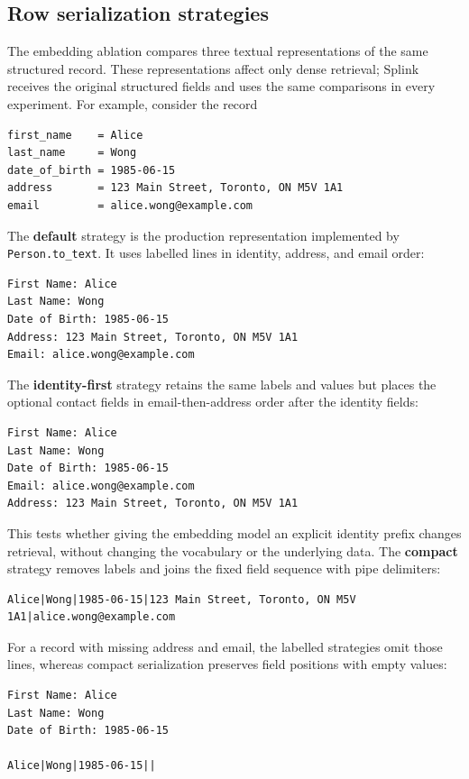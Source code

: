 \documentclass[conference]{IEEEtran}
\begin{document}
\subsection{Row serialization strategies}
The embedding ablation compares three textual representations of the same structured record. These representations affect only dense retrieval; Splink receives the original structured fields and uses the same comparisons in every experiment. For example, consider the record

\begin{lstlisting}
first_name    = Alice
last_name     = Wong
date_of_birth = 1985-06-15
address       = 123 Main Street, Toronto, ON M5V 1A1
email         = alice.wong@example.com
\end{lstlisting}

The \textbf{default} strategy is the production representation implemented by \texttt{Person.to\_text}. It uses labelled lines in identity, address, and email order:

\begin{lstlisting}
First Name: Alice
Last Name: Wong
Date of Birth: 1985-06-15
Address: 123 Main Street, Toronto, ON M5V 1A1
Email: alice.wong@example.com
\end{lstlisting}

The \textbf{identity-first} strategy retains the same labels and values but places the optional contact fields in email-then-address order after the identity fields:

\begin{lstlisting}
First Name: Alice
Last Name: Wong
Date of Birth: 1985-06-15
Email: alice.wong@example.com
Address: 123 Main Street, Toronto, ON M5V 1A1
\end{lstlisting}

This tests whether giving the embedding model an explicit identity prefix changes retrieval, without changing the vocabulary or the underlying data. The \textbf{compact} strategy removes labels and joins the fixed field sequence with pipe delimiters:

\begin{lstlisting}
Alice|Wong|1985-06-15|123 Main Street, Toronto, ON M5V 1A1|alice.wong@example.com
\end{lstlisting}

For a record with missing address and email, the labelled strategies omit those lines, whereas compact serialization preserves field positions with empty values:

\begin{lstlisting}
First Name: Alice
Last Name: Wong
Date of Birth: 1985-06-15

Alice|Wong|1985-06-15||
\end{lstlisting}
\end{document}

